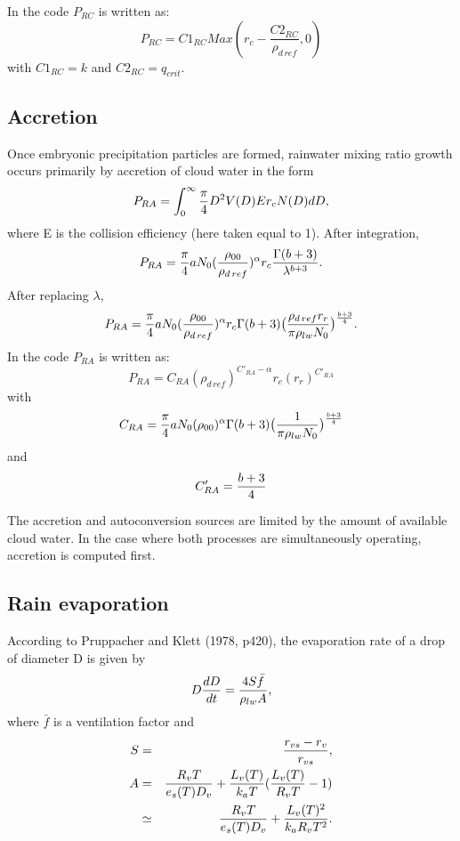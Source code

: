 In the code $P_{RC}$ is written as:
\begin{equation}
P_{RC}= C1_{RC} Max ( r_c - \dfrac{C2_{RC}}{\rho_{d\,ref}}, 0)
\end{equation}
with $C1_{RC}= k$ and $C2_{RC}=q_{crit}$.


\subsection{Accretion}
Once embryonic precipitation particles are formed, rainwater mixing ratio
growth occurs
primarily by accretion of cloud water in the form
\begin{equation}
P_{RA}=\int_0^\infty {\pi \over 4}D^2 V(D) E  r_c N(D)dD,
\end{equation}
where E is the collision efficiency (here taken equal to 1).
After integration,
\begin{equation}
P_{RA}={\pi \over 4}a N_0( \dfrac{ \rho_{00}}{ \rho_{d\,ref}})^{\alpha}
 r_c{\Gamma(b+3) \over \lambda ^{b+3}}.
\end{equation}
After replacing $\lambda$,
\begin{equation}
P_{RA}={\pi \over 4}a N_0( \dfrac{ \rho_{00}}{ \rho_{d\,ref}})^{\alpha}
 r_c  \Gamma(b+3) \big( {\rho_{d\,ref} r_r \over \pi \rho_{lw} N_0}\big)
^{b+3 \over 4}.
\end{equation}
In the code $P_{RA}$ is written as:
\begin{equation}
P_{RA}= C_{RA}( \rho_{d\,ref})^{C'_{RA}-\alpha}  r_c ( r_r )^{C'_{RA}}
\end{equation}
with
$$ C_{RA}={\pi \over 4}a N_0( \rho_{00})^{\alpha} \Gamma(b+3)
\big( {1 \over \pi \rho_{lw} N_0}\big)
^{b+3 \over 4}$$
and $$C'_{RA}={b+3 \over 4}$$

The accretion and autoconversion sources are limited by the amount of available
cloud water. In the case where both processes are simultaneously operating,
accretion is computed first.

\subsection{Rain evaporation}
According to Pruppacher and Klett (1978, p420), the evaporation rate of a drop
of diameter D is given by
\begin{equation}
D {dD \over dt} = {4S \bar f \over \rho_{lw} A}, \label{eq17}
\end{equation}
where $\bar f$ is a ventilation factor and
\begin{eqnarray}
S&=& {r_{vs}-r_v \over r_{vs}}, \\
A&=& {R_v T \over e_s(T) D_v} + {L_v(T) \over k_a T}({L_v(T) \over R_v T} -1)\\
 &\simeq &{R_v T \over e_s(T) D_v} + {L_v(T)^2 \over k_a R_v T^2}  .
\end{eqnarray}

